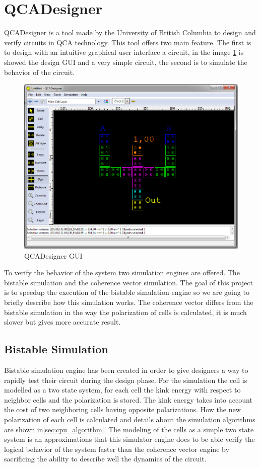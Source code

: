\section{QCADesigner}
QCADesigner is a tool made by the University of British Columbia to design and verify circuits in QCA technology. This tool offers two main feature. The first is to design with an intuitive graphical user interface a circuit, in the image \ref{img:ambiente} is showed the design GUI and a very simple circuit, the second is to simulate the behavior of the circuit. 

\begin{figure}
\centering
\includegraphics[scale=0.4]{img/QCADesigner.png}
\caption{QCADesigner GUI}
\label{img:ambiente}
\end{figure}
To verify the behavior of the system two simulation engines are offered. The bistable simulation and the coherence vector simulation. The goal of this project is to speedup the execution of the bistable simulation engine so we are going to briefly describe  how this simulation works. The coherence vector differs from the bistable simulation in the way the polarization of cells is calculated, it is much slower but gives more accurate result.

\subsection{Bistable Simulation}
Bistable simulation engine has been created in order to give designers a way to rapidly test their circuit during the design phase. For the simulation the cell is modelled as a two state system, for each cell the kink energy with respect to neighbor cells and the polarization is stored. The kink energy takes into account the cost of two neighboring cells having opposite polarizations. How the new polarization of each cell is calculated and details about the simulation algorithms are shown in\ref{sec:cpu_algorithm}. The modeling of the cells as a simple two state system is an approximations that this simulator engine does to be able verify the logical behavior of the system faster than the coherence vector engine by sacrificing the ability to describe well the dynamics of the circuit. 


